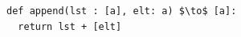 \documentclass[border=10pt]{standalone}
\begin{document}
\begin{lstlisting}
def append(lst : [a], elt: a) $\to$ [a]:
  return lst + [elt]
\end{lstlisting}
\end{document}
